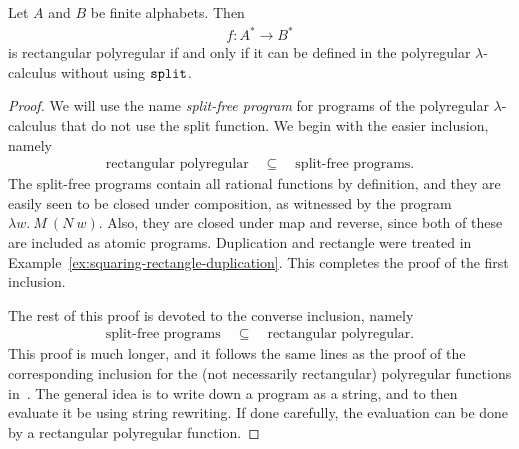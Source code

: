 \begin{theorem}\label{thm:rectangular-polyregular-programs-split-free}
    Let $A$ and $B$ be finite alphabets. Then 
    \begin{align*}
    f : A^* \to B^*
    \end{align*}
    is  rectangular polyregular if and only if it can be defined in  the polyregular $\lambda$-calculus without using $\mathtt{split}$.
\end{theorem}
\begin{proof}
    We will use the name \emph{split-free program} for programs of the polyregular $\lambda$-calculus that do not use the split function. We begin with the easier inclusion, namely 
    \begin{align*}
    \text{rectangular polyregular} 
    \quad \subseteq \quad 
    \text{split-free programs}.
    \end{align*}
    The split-free programs contain all rational functions by definition, and they are easily seen to be closed under composition, as witnessed by the program 
    $ \lambda w.\ M\  (N\  w).$
    Also, they are closed under map and reverse, since both of these are included as atomic programs. Duplication and rectangle were treated in Example~\ref{ex:squaring-rectangle-duplication}.
    This completes the proof of the first inclusion. 

    The rest of this proof is devoted to the converse inclusion, namely
    \begin{align*}
    \text{split-free programs} 
    \quad \subseteq \quad 
    \text{rectangular polyregular}.
    \end{align*}
    This proof is much longer, and it  follows the same lines as the proof of the corresponding inclusion for the  (not necessarily rectangular) polyregular functions in~\cite[Theorem 4.1]{polyregular-survey}. The general idea is to 
write down a program as a string, and to then evaluate it be using string rewriting. If done carefully, the evaluation can be done by a rectangular polyregular function.


    


\end{proof}
